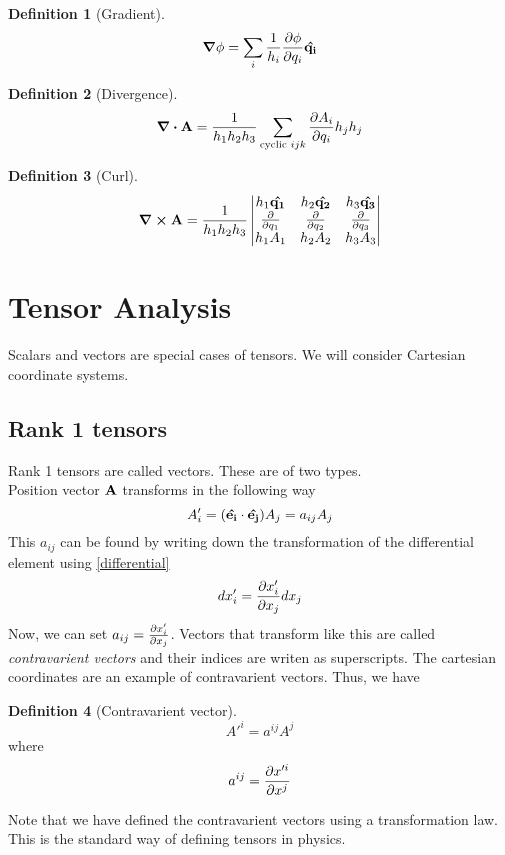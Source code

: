 \documentclass[10pt, a4paper]{extarticle}
\theoremstyle{definition}
\newtheorem{defn}{Definition}
\numberwithin{equation}{subsection}
\begin{document}
\begin{framed}
	\begin{defn}[Gradient]
		\begin{equation}\grad{\phi}=\sum_i\frac{1}{h_i}\pdv{\phi}{q_i}\vu{q_i}\end{equation}
	\end{defn}
	\begin{defn}[Divergence]
		\begin{equation}\div{\vb{A}}=\frac{1}{h_1h_2h_3}\sum_{\text{cyclic }ijk}\pdv{A_i}{q_i}h_jh_j\end{equation}
	\end{defn}
	\begin{defn}[Curl]
		\begin{equation}\curl{\vb{A}}=\frac{1}{h_1h_2h_3}\left|
			\begin{matrix}
				h_1\vu{q_1} & h_2\vu{q_2} & h_3\vu{q_3} \\
				\pdv{}{q_1} & \pdv{}{q_2} & \pdv{}{q_3} \\
				h_1A_1      & h_2A_2      & h_3A_3
			\end{matrix}
			\right|\end{equation}
	\end{defn}
\end{framed}

\newpage
\section{Tensor Analysis}
Scalars and vectors are special cases of tensors. We will consider Cartesian coordinate systems.
\subsection{Rank 1 tensors}
Rank 1 tensors are called vectors. These are of two types.\\
Position vector $\vb{A}$ transforms in the following way
\begin{equation*}
	A'_i=(\vu{e_i}\cdot \vu{e_j})A_j=a_{ij}A_j\label{a}
\end{equation*}
This $a_{ij}$ can be found by writing down the transformation of the differential element using \eqref{differential}
\begin{equation*}dx'_i=\pdv{x'_i}{x_j}dx_j\end{equation*}
Now, we can set $a_{ij}=\pdv{x'_i}{x_j}$. Vectors that transform like this are called \emph{contravarient vectors} and their indices are writen as superscripts. The cartesian coordinates are an example of contravarient vectors. Thus, we have
\begin{framed}
	\begin{defn}[Contravarient vector]
		\begin{equation}
			A'^i=a^{ij}A^j
		\end{equation}
		where \begin{equation}a^{ij}=\pdv{x'^i}{x^j}\end{equation}
	\end{defn}
\end{framed}
Note that we have defined the contravarient vectors using a transformation law. This is the standard way of defining tensors in physics.
\end{document}
